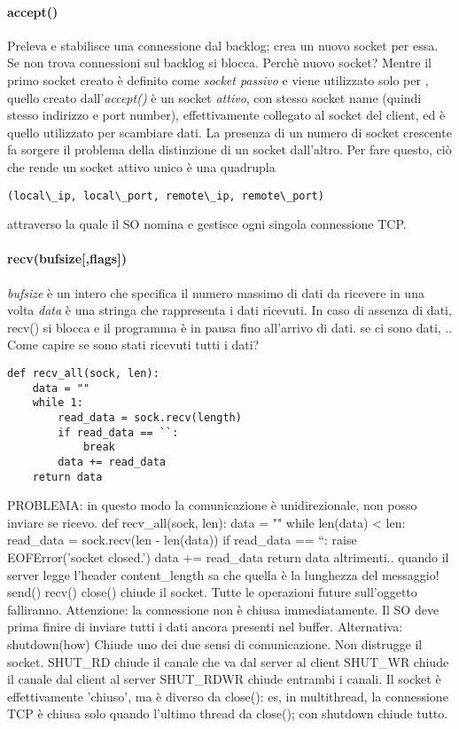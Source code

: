 \begin{minipage}[t]{0.45\textwidth}
\paragraph{accept()}
Preleva e stabilisce una connessione dal backlog; crea un nuovo socket per essa.
Se non trova connessioni sul backlog si blocca.	
Perchè nuovo socket?
Mentre il primo socket creato è definito come \textit{socket passivo} e viene utilizzato solo per %
, quello creato dall'\textit{accept()} è un socket \textit{attivo}, con stesso socket name (quindi stesso indirizzo e port number), effettivamente collegato al socket del client, ed è quello utilizzato per scambiare dati.
La presenza di un numero di socket crescente fa sorgere il problema della distinzione di un socket dall'altro.
Per fare questo, ciò che rende un socket attivo unico è una quadrupla
\begin{lstlisting}
(local\_ip, local\_port, remote\_ip, remote\_port)
\end{lstlisting}
attraverso la quale il SO nomina e gestisce ogni singola connessione TCP.
	
\paragraph{recv(bufsize[,flags])}
	\textit{bufsize} è un intero che specifica il numero massimo di dati da ricevere in una volta
	\textit{data} è una stringa che rappresenta i dati ricevuti. In caso di assenza di dati, recv() si blocca e il programma è in pausa fino all'arrivo di dati.
		se ci sono dati, ..
	Come capire se sono stati ricevuti tutti i dati?
\begin{lstlisting}
def recv_all(sock, len):
	data = ""
	while 1:
		read_data = sock.recv(length)
		if read_data == ``:
			break
		data += read_data
	return data
\end{lstlisting}
		PROBLEMA: in questo modo la comunicazione è unidirezionale, non posso inviare se ricevo.
		def recv\_all(sock, len):
			data = ""
			while len(data) < len:
				read\_data = sock.recv(len - len(data))
				if read\_data == ``:
					raise EOFError('socket closed.')
				data += read\_data
			return data
		altrimenti..
			quando il server legge l'header content\_length sa che quella è la lunghezza del messaggio!			
send()
recv()
close()
	chiude il socket.
	Tutte le operazioni future sull'oggetto falliranno.
	Attenzione: la connessione non è chiusa immediatamente. Il SO deve prima finire di inviare tutti i dati ancora presenti nel buffer.
	Alternativa:
		shutdown(how)
			Chiude uno dei due sensi di comunicazione. Non distrugge il socket.
			SHUT\_RD chiude il canale che va dal server al client
			SHUT\_WR chiude il canale dal client al server
			SHUT\_RDWR chiude entrambi i canali. Il socket è effettivamente 'chiuso', ma è diverso da close(): es, in multithread, la connessione TCP è chiusa solo quando l'ultimo thread da close(); con shutdown chiude tutto.

\end{minipage}
